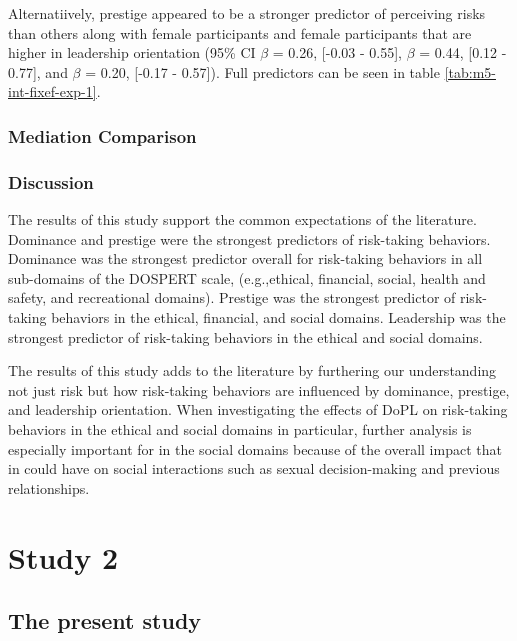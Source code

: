 \documentclass[
  donotrepeattitle,doc, 12pt, a4paper,floatsintext]{apa7}
\begin{document}
Alternatiively, prestige appeared to be a stronger predictor of perceiving risks than others along with female participants and female participants that are higher in leadership orientation (95\% CI \(\beta\) = 0.26, {[}-0.03 - 0.55{]}, \(\beta\) = 0.44, {[}0.12 - 0.77{]}, and \(\beta\) = 0.20, {[}-0.17 - 0.57{]}). Full predictors can be seen in table \ref{tab:m5-int-fixef-exp-1}.

\hypertarget{mediation-comparison}{%
\subsubsection{Mediation Comparison}\label{mediation-comparison}}

\hypertarget{discussion}{%
\subsubsection{Discussion}\label{discussion}}

The results of this study support the common expectations of the literature. Dominance and prestige were the strongest predictors of risk-taking behaviors. Dominance was the strongest predictor overall for risk-taking behaviors in all sub-domains of the DOSPERT scale, (e.g.,ethical, financial, social, health and safety, and recreational domains). Prestige was the strongest predictor of risk-taking behaviors in the ethical, financial, and social domains. Leadership was the strongest predictor of risk-taking behaviors in the ethical and social domains.

The results of this study adds to the literature by furthering our understanding not just risk but how risk-taking behaviors are influenced by dominance, prestige, and leadership orientation. When investigating the effects of DoPL on risk-taking behaviors in the ethical and social domains in particular, further analysis is especially important for in the social domains because of the overall impact that in could have on social interactions such as sexual decision-making and previous relationships.

\newpage

\hypertarget{study-2}{%
\section{Study 2}\label{study-2}}

\hypertarget{the-present-study}{%
\subsection{The present study}\label{the-present-study}}
\end{document}
